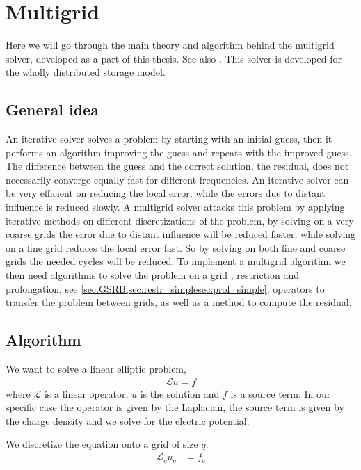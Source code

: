 
\section{Multigrid}
	\label{sec:multigrid}
	Here we will go through the main theory and
	algorithm behind the multigrid solver, developed as a part of this thesis.
	See also \citep{press_numerical_1988,trottenberg_multigrid_2000}.
	This solver is developed for the wholly distributed storage model.

	\subsection{General idea}
		\label{sec:mg_impl}
		An iterative solver solves a problem by starting with an initial guess, then it performs an algorithm
		improving the guess and repeats with the improved guess. The difference between
		the guess and the correct solution, the residual, does not necessarily converge equally fast for different frequencies.
		An iterative solver can be very efficient on reducing the local error,
		while the errors due to distant influence is reduced slowly.
		A multigrid solver attacks this problem by applying iterative methods on different discretizations of the problem, by solving on a very coarse grids
		the error due to distant influence will be reduced faster, while solving on a fine grid reduces the local error fast. So by solving on both
		fine and coarse grids the needed cycles will be reduced. To implement a multigrid algorithm we then need algorithms to solve the problem on a grid ,
		restriction and prolongation, see \cref{sec:GSRB,sec:restr_simplesec:prol_simple}, operators to transfer the problem between grids, as well as a method to compute the residual.


	\subsection{Algorithm}
	We want to solve a linear elliptic problem,
		\begin{align}
			\mathcal{L} u = f
		\end{align}
	where \(\mathcal{L}\) is a linear operator, \(u\) is the solution and \(f\) is
	a source term. In our specific case the operator is given by the Laplacian, the
	source term is given by the charge density and we solve for the electric potential.

	We discretize the equation onto a grid of size \(q\).
	\begin{align}
		\mathcal{L}_q u_q &= f_q \label{eq:difference}
	\end{align}


